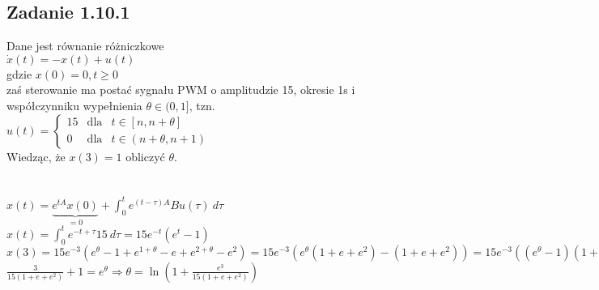 \pagebreak
\subsection*{Zadanie 1.10.1} {\color{darkgray}
	Dane jest równanie różniczkowe\\
	$\dot{x}(t)=-x(t)+u(t)$\\
	gdzie $x(0)=0, t\geqslant 0$\\
	zaś sterowanie ma postać sygnału PWM o amplitudzie 15, okresie 1s i współczynniku wypełnienia $\theta \in (0,1]$, tzn.\\
	$u(t)=\left\{ \begin{array}{ccl} 15 &\text{dla} & t\in [n,n+\theta] \\ 0 & \text{dla} &t \in(n+\theta, n+1)\end{array}\right.$\\
	Wiedząc, że $x(3)=1$ obliczyć $\theta$.\\
}\lineh
\\\\
$x(t)=\underbrace{e^{tA}x(0)}_{=0}+\int^t_0 e^{(t-\tau)A}Bu(\tau)\ d\tau$\\
$x(t)=\int^t_0 e^{-t+\tau}15 \ d\tau=15e^{-t}(e^{t}-1)$\\
$x(3)=15e^{-3}(e^\theta-1+e^{1+\theta}-e+e^{2+\theta}-e^2)=15e^{-3}(e^\theta(1+e+e^2)-(1+e+e^2))=15e^{-3}((e^\theta-1)(1+e+e^2))=\boxed{1}$\\
$\frac{3}{15(1+e+e^2)}+1=e^\theta \Rightarrow \boxed{\theta=\ln(1+\frac{e^3}{15(1+e+e^2)})}$\\

